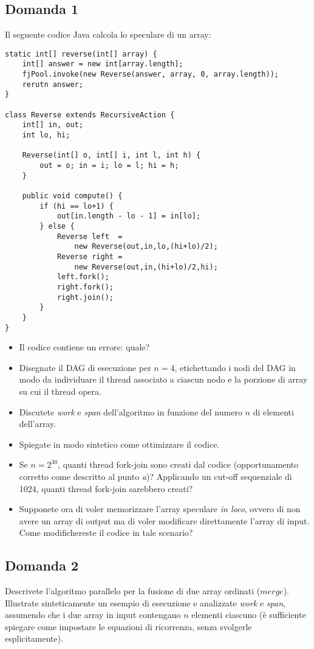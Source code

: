 \subsection{Domanda 1}
Il seguente codice Java calcola lo speculare di un array:
\begin{lstlisting}
static int[] reverse(int[] array) {
	int[] answer = new int[array.length];
	fjPool.invoke(new Reverse(answer, array, 0, array.length));
	rerutn answer;
}

class Reverse extends RecursiveAction {
	int[] in, out;
	int lo, hi;

	Reverse(int[] o, int[] i, int l, int h) {
		out = o; in = i; lo = l; hi = h;
	}

	public void compute() {
		if (hi == lo+1) {
			out[in.length - lo - 1] = in[lo];
		} else {
			Reverse left  =
				new Reverse(out,in,lo,(hi+lo)/2);
			Reverse right =
				new Reverse(out,in,(hi+lo)/2,hi);
			left.fork();
			right.fork();
			right.join();
		}
	}
}
\end{lstlisting}
\begin{itemize}
	\item Il codice contiene un errore: quale?
	\item Disegnate il DAG di esecuzione per $n = 4$, etichettando i nodi del DAG in modo da individuare il thread associato a ciascun nodo e la porzione di array su cui il thread opera.
	\item Discutete \textit{work} e \textit{span} dell'algoritmo in funzione del numero $n$ di elementi dell'array.
	\item Spiegate in modo sintetico come ottimizzare il codice.
	\item Se $n = 2^{30}$, quanti thread fork-join sono creati dal codice (opportunamento corretto come descritto al punto \textit{a})? Applicando un cut-off sequenziale di 1024, quanti thread fork-join sarebbero creati?
	\item Supponete ora di voler memorizzare l'array speculare \textit{in loco}, ovvero di non avere un array di output ma di voler modificare direttamente l'array di input. Come modifichereste il codice in tale scenario?
\end{itemize}

\newpage

\subsection{Domanda 2}
Descrivete l'algoritmo parallelo per la fusione di due array ordinati ($merge$). Illustrate sinteticamente un esempio di esecuzione e analizzate \textit{work} e \textit{span}, assumendo che i due array in input contengano $n$ elementi ciascuno (è sufficiente spiegare come impostare le equazioni di ricorrenza, senza svolgerle esplicitamente).

